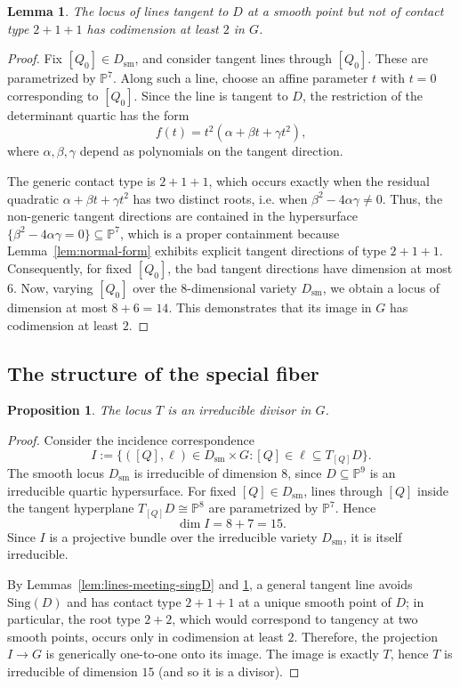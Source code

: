 \documentclass[11pt]{article}
\newtheorem{proposition}[theorem]{Proposition}
\newtheorem{lemma}[theorem]{Lemma}
\newcommand{\Pj}{\mathbb P}
\newcommand{\Sing}{\mathrm{Sing}}
\begin{document}
\begin{lemma}\label{lem:bad-tangent-directions}
The locus of lines tangent to $D$ at a smooth point but not of contact type $2+1+1$ has codimension at least $2$ in $G$.
\end{lemma}

\begin{proof}
Fix $[Q_0]\in D_{\mathrm{sm}}$, and consider tangent lines through $[Q_0]$. These are parametrized by $\Pj^7$. Along such a line, choose an affine parameter $t$ with $t=0$ corresponding to $[Q_0]$. Since the line is tangent to $D$, the restriction of the determinant quartic has the form
\[
f(t)= t^2(\alpha+\beta t+\gamma t^2),
\]
where $\alpha,\beta,\gamma$ depend as polynomials on the tangent direction.

The generic contact type is $2+1+1$, which occurs exactly when the residual quadratic
$\alpha+\beta t+\gamma t^2$
has two distinct roots, i.e. when
$\beta^2-4\alpha\gamma\neq 0.$
Thus, the non-generic tangent directions are contained in the hypersurface
$\{\beta^2-4\alpha\gamma=0\} \subseteq \Pj^7$, which is a proper containment because Lemma~\ref{lem:normal-form} exhibits explicit tangent directions of type $2+1+1$. Consequently, for fixed $[Q_0]$, the bad tangent directions have dimension at most $6$. Now, varying $[Q_0]$ over the $8$-dimensional variety $D_{\mathrm{sm}}$, we obtain a locus of dimension at most $8+6=14.$
This demonstrates that its image in $G$ has codimension at least $2$.
\end{proof}

\subsection{The structure of the special fiber}

\begin{proposition}\label{prop:T-irreducible}
The locus $T$ is an irreducible divisor in $G$.
\end{proposition}

\begin{proof}
Consider the incidence correspondence
\[
I:=\{([Q],\ell)\in D_{\mathrm{sm}}\times G : [Q]\in \ell\subseteq T_{[Q]}D\}.
\]
The smooth locus $D_{\mathrm{sm}}$ is irreducible of dimension $8$, since $D\subseteq \Pj^9$ is an irreducible quartic hypersurface. For fixed $[Q]\in D_{\mathrm{sm}}$, lines through $[Q]$ inside the tangent hyperplane $T_{[Q]}D\cong \Pj^8$ are parametrized by $\Pj^7$. Hence
\[
\dim I = 8+7=15.
\]
Since $I$ is a projective bundle over the irreducible variety $D_{\mathrm{sm}}$, it is itself irreducible.

By Lemmas~\ref{lem:lines-meeting-singD} and \ref{lem:bad-tangent-directions}, a general tangent line avoids $\Sing(D)$ and has contact type $2+1+1$ at a unique smooth point of $D$; in particular, the root type $2+2$, which would correspond to tangency at two smooth points, occurs only in codimension at least $2$. Therefore, the projection $I\to G$ is generically one-to-one onto its image. The image is exactly $T$, hence $T$ is irreducible of dimension $15$ (and so it is a divisor).
\end{proof}
\end{document}
